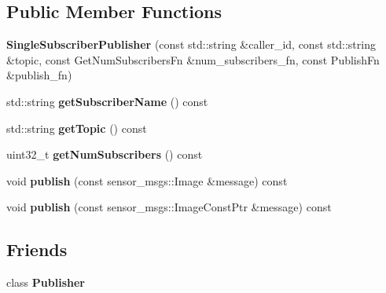 \subsection*{Public Member Functions}
\begin{DoxyCompactItemize}
\item 
\hypertarget{classimage__transport_1_1_single_subscriber_publisher_a4ed3520bfb119863c33890b1d3d76f7b}{{\bfseries Single\-Subscriber\-Publisher} (const std\-::string \&caller\-\_\-id, const std\-::string \&topic, const Get\-Num\-Subscribers\-Fn \&num\-\_\-subscribers\-\_\-fn, const Publish\-Fn \&publish\-\_\-fn)}\label{classimage__transport_1_1_single_subscriber_publisher_a4ed3520bfb119863c33890b1d3d76f7b}

\item 
\hypertarget{classimage__transport_1_1_single_subscriber_publisher_a1ddcc26cfb38ee6fec7bbc1e573d032d}{std\-::string {\bfseries get\-Subscriber\-Name} () const }\label{classimage__transport_1_1_single_subscriber_publisher_a1ddcc26cfb38ee6fec7bbc1e573d032d}

\item 
\hypertarget{classimage__transport_1_1_single_subscriber_publisher_a345d09ecd9691da5a215751dcde7c529}{std\-::string {\bfseries get\-Topic} () const }\label{classimage__transport_1_1_single_subscriber_publisher_a345d09ecd9691da5a215751dcde7c529}

\item 
\hypertarget{classimage__transport_1_1_single_subscriber_publisher_a5909a3e2feffe1abea5d0133a4d933a5}{uint32\-\_\-t {\bfseries get\-Num\-Subscribers} () const }\label{classimage__transport_1_1_single_subscriber_publisher_a5909a3e2feffe1abea5d0133a4d933a5}

\item 
\hypertarget{classimage__transport_1_1_single_subscriber_publisher_a6e5fb2d5f07e0b6e5fc7a67f7e733d58}{void {\bfseries publish} (const sensor\-\_\-msgs\-::\-Image \&message) const }\label{classimage__transport_1_1_single_subscriber_publisher_a6e5fb2d5f07e0b6e5fc7a67f7e733d58}

\item 
\hypertarget{classimage__transport_1_1_single_subscriber_publisher_a805ee398c71b942665f0e6a8878868f4}{void {\bfseries publish} (const sensor\-\_\-msgs\-::\-Image\-Const\-Ptr \&message) const }\label{classimage__transport_1_1_single_subscriber_publisher_a805ee398c71b942665f0e6a8878868f4}

\end{DoxyCompactItemize}
\subsection*{Friends}
\begin{DoxyCompactItemize}
\item 
\hypertarget{classimage__transport_1_1_single_subscriber_publisher_a9544c98126549cae8f3a5cd9af6bcfdd}{class {\bfseries Publisher}}\label{classimage__transport_1_1_single_subscriber_publisher_a9544c98126549cae8f3a5cd9af6bcfdd}

\end{DoxyCompactItemize}


